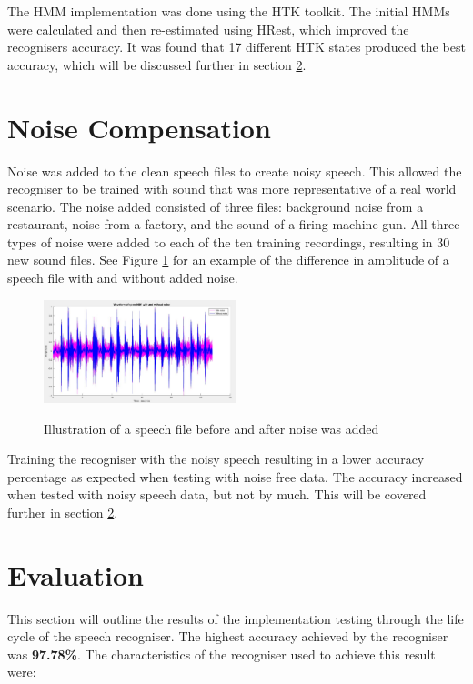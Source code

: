\documentclass[journal]{IEEEtran}
\begin{document}
The HMM implementation was done using the HTK toolkit. The initial HMMs were calculated and then re-estimated using HRest, which improved the recognisers accuracy. It was found that 17 different HTK states produced the best accuracy, which will be discussed further in section \ref{evaluation}. 


\section{Noise Compensation}
Noise was added to the clean speech files to create noisy speech. This allowed the recogniser to be trained with sound that was more representative of a real world scenario. The noise added consisted of three files: background noise from a restaurant, noise from a factory, and the sound of a firing machine gun. All three types of noise were added to each of the ten training recordings, resulting in 30 new sound files. See Figure \ref{fig:noise} for an example of the difference in amplitude of a speech file with and without added noise.

\begin{figure}[!htb]
	\centering
	\captionsetup{justification=centering}
	\includegraphics[width=0.5\textwidth]{noise_effect.jpg}\\
	\caption{Illustration of a speech file before and after noise was added}\label{fig:noise}
\end{figure}

Training the recogniser with the noisy speech resulting in a lower accuracy percentage as expected when testing with noise free data. The accuracy increased when tested with noisy speech data, but not by much. This will be covered further in section \ref{evaluation}.


\section{Evaluation}\label{evaluation}
	This section will outline the results of the implementation testing through the life cycle of the speech recogniser. The highest accuracy achieved by the recogniser was \textbf{97.78\%}. The characteristics of the recogniser used to achieve this result were:
	
\end{document}
